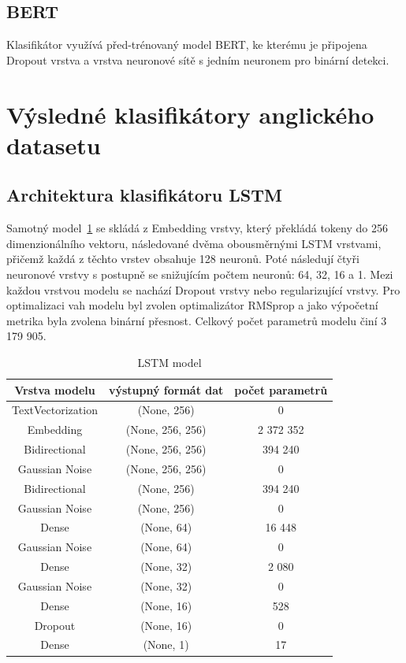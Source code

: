 \subsection{BERT}
Klasifikátor využívá před-trénovaný model BERT, ke kterému je připojena Dropout vrstva a vrstva neuronové sítě s jedním neuronem pro binární detekci.

\section{Výsledné klasifikátory anglického datasetu}

\subsection{Architektura klasifikátoru LSTM}\label{arch: LSTM}
Samotný model~\ref{tab:LSTM model} se skládá z Embedding vrstvy, který překládá tokeny do 256 dimenzionálního vektoru, následované dvěma obousměrnými LSTM vrstvami, přičemž každá z těchto vrstev obsahuje 128 neuronů.
Poté následují čtyři neuronové vrstvy s postupně se snižujícím počtem neuronů: 64, 32, 16 a 1.
Mezi každou vrstvou modelu se nachází Dropout vrstvy nebo regularizující vrstvy. Pro optimalizaci vah modelu byl zvolen optimalizátor RMSprop a jako výpočetní metrika byla zvolena binární přesnost. 
Celkový počet parametrů modelu činí 3 179 905.

\begin{table}[H]
	\centering
	\caption{LSTM model}\label{tab:LSTM model}
	\begin{tabular}{ c c c }
			\toprule
			Vrstva modelu & výstupný formát dat & počet parametrů\\
			\midrule
            TextVectorization & (None, 256) & 0\\         
            Embedding & (None, 256, 256) & 2 372 352\\   
            Bidirectional & (None, 256, 256) & 394 240\\    
			Gaussian Noise & (None, 256, 256) & 0\\
            Bidirectional & (None, 256) & 394 240\\
			Gaussian Noise & (None, 256) & 0\\
            Dense & (None, 64) & 16 448\\ 
			Gaussian Noise & (None, 64) & 0\\
			Dense & (None, 32) & 2 080\\ 
			Gaussian Noise & (None, 32) & 0\\
			Dense & (None, 16) & 528\\ 
            Dropout & (None, 16) & 0\\   
            Dense & (None, 1) & 17\\ 
			\midrule
		\end{tabular}
\end{table}

